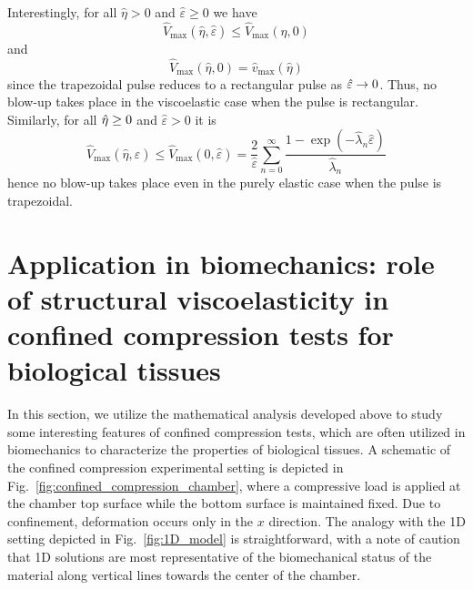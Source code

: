 \documentclass[12pt,a4paper]{amsart}
\theoremstyle{definition}
\begin{document}
%
Interestingly, for all $\hat{\eta}>0$ and $\hat{\varepsilon}\geq 0$ we have%
\begin{equation*}
\hat{V}_{\max }\left( \hat{\eta},\hat{\varepsilon}\right) \leq \hat{V}_{\max
}\left( \hat{\eta},0\right)
\end{equation*}%
and
\begin{equation*}
\hat{V}_{\max }\left( \hat{\eta},0\right) =\hat{v}_{\max }\left( \hat{\eta}%
\right)
\end{equation*}%
since the trapezoidal pulse reduces to a rectangular pulse as $\hat{%
\varepsilon}\rightarrow 0$. Thus, no blow-up takes place in the
viscoelastic case when the pulse is rectangular. Similarly, for all $\hat{%
\eta}\geq 0$ and $\hat{\varepsilon}>0$ it is%
\begin{equation*}
\hat{V}_{\max }\left( \hat{\eta},\hat{\varepsilon}\right) \leq \hat{V}_{\max
}\left( 0,\hat{\varepsilon}\right) =\frac{2}{\hat{\varepsilon}}%
\sum_{n=0}^{\infty }\frac{1-\exp \left( -\hat{\lambda}_{n}\hat{\varepsilon}%
\right) }{\hat{\lambda}_{n}}
\end{equation*}%
hence no blow-up takes place even in the purely elastic case when the pulse
is trapezoidal.


\section{Application in biomechanics: role of structural viscoelasticity in confined compression tests for biological tissues}\label{sec:athesian_soltz_case}

In this section, we utilize the mathematical analysis developed above to study some interesting features of confined compression tests, which are often utilized in biomechanics to characterize the properties of biological tissues.
A schematic of the confined compression experimental setting is depicted in Fig.~\ref{fig:confined_compression_chamber}, where a compressive load
is applied at the chamber top surface while
the bottom surface is maintained fixed.
Due to confinement,
deformation occurs only in the $x$ direction. The analogy with the 1D setting depicted in Fig.~\ref{fig:1D_model} is  straightforward, with a note of caution that 1D solutions are most representative of the biomechanical status of the material along vertical lines towards the center of the chamber.
\end{document}
